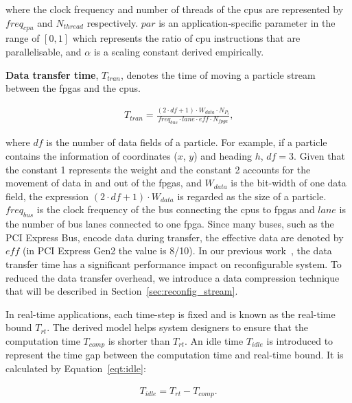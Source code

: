 where the clock frequency and number of threads of the \glspl{cpu} are represented by $freq_{cpu}$ and $N_{thread}$ respectively.
$par$ is an application-specific parameter in the range of $[0,1]$ which represents the ratio of \gls{cpu} instructions that are parallelisable, and $\alpha$ is a scaling constant derived empirically.

\textbf{Data transfer time}, $T_{tran}$, denotes the time of moving a particle stream between the \glspl{fpga} and the \glspl{cpu}.

\begin{equation}
\begin{aligned}
T_{tran} = \frac{(2 \cdot df + 1) \cdot W_{data} \cdot {N_{P_t}}}{freq_{bus} \cdot lane \cdot eff \cdot N_{fpga}} \mbox{,}
\end{aligned}
\label{eqt:data}
\end{equation}

where $df$ is the number of data fields of a particle.
For example, if a particle contains the information of coordinates ($x$, $y$) and heading $h$, $df=3$.
Given that the constant 1 represents the weight and the constant 2 accounts for the movement of data in and out of the \glspl{fpga},
and $W_{data}$ is the bit-width of one data field, the expression $(2 \cdot df + 1) \cdot W_{data}$ is regarded as the size of a particle.
$freq_{bus}$ is the clock frequency of the bus connecting the \glspl{cpu} to \glspl{fpga} and $lane$ is the number of bus lanes connected to one \gls{fpga}.
Since many buses, such as the PCI Express Bus, encode data during transfer, the effective data are denoted by $eff$ (in PCI Express Gen2 the value is 8/10).
In our previous work~\cite{chau13arc}, the data transfer time has a significant performance impact on reconfigurable system.
To reduced the data transfer overhead, we introduce a data compression technique that will be described in Section~\ref{sec:reconfig_stream}.

In real-time applications, each time-step is fixed and is known as the real-time bound $T_{rt}$.
The derived model helps system designers to ensure that the computation time $T_{comp}$ is shorter than $T_{rt}$.
An idle time $T_{idle}$ is introduced to represent the time gap between the computation time and real-time bound.
It is calculated by Equation~\ref{eqt:idle}:

\begin{equation}
\begin{aligned}
T_{idle} = T_{rt} - T_{comp} \mbox{.}
\end{aligned}
\label{eqt:idle}
\end{equation}

